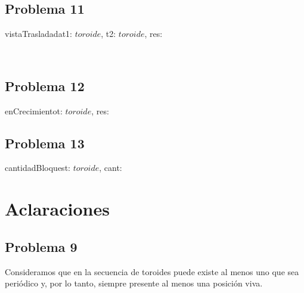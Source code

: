 \documentclass[a4paper]{article}
\begin{document}
    	\newpage
    	
    	\subsection{Problema 11}
	
	    \begin{proc}{vistaTrasladada}{\In t1: $toroide$, \In t2: $toroide$, \Out res: \bool}{}
    	\end{proc} \\
    	
    	\subsection{Problema 12}
    	
    	\begin{proc}{enCrecimiento}{\In t: $toroide$, \Out res: \bool}{}
    	\end{proc} 
    	
    	\subsection{Problema 13}
    	
    	\begin{proc}{cantidadBloques}{\In t: $toroide$, \Out cant: \ent}{}
    	\end{proc}
   
	
	\section{Aclaraciones}
	    
	    \subsection{Problema 9}
	    
	        Consideramos que en la secuencia de toroides puede existe al menos uno que sea periódico y, por lo tanto, siempre presente al menos una posición viva. \vspace{1em}
	    
\end{document}
